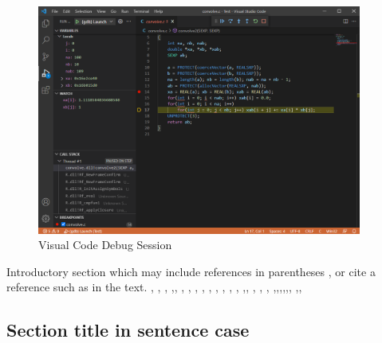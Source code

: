 \begin{Schunk}
\begin{figure}[htbp]
{\centering \includegraphics[width=0.95\textwidth]{VisualCode} 

}
\caption[Visual Code Debug Session]{Visual Code Debug Session}\label{fig:VisualCode}
\end{figure}
\end{Schunk}

Introductory section which may include references in parentheses
\citep{R}, or cite a reference such as \citet{R} in the text. \citep{Rcpp}, \citep{RcppEigen}, \citep{TMB}, \citep{Rextensions}
\citep{DebuggingC_Cpp},\citep{DebuggingRandCcodeinR}, \citep{CodeLLDB-manual}, \citep{CodeLLDB}, \citep{VSCodeTipsTricks}, 
\citep{VSCodeDownload}, \citep{VSCodeCCppExt}, \citep{VSCodeCCpp}, \citep{GDB}, \citep{ModernDebugging}, \citep{DDD},
\citep{ImprovingCppDebug},\citep{UsingRtools}, \citep{RcppIntro}, \citep{ihaka:1996}, \citep{RcppEigenLA},
\citep{TMBlaplace},\citep{DotC},\citep{DotC2},\citep{deSolve},\citep{Routines},\citep{LLDB},
\citep{Xcode},\citep{debug-visualize-ext},\citep{debug-visualize}

\hypertarget{section-title-in-sentence-case}{%
\subsection{Section title in sentence
case}\label{section-title-in-sentence-case}}

%
%
%

